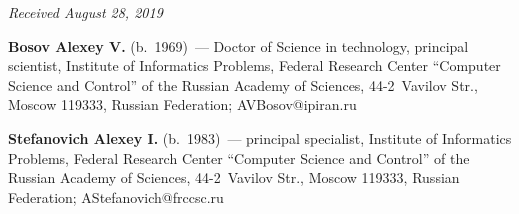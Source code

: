 \vspace*{-9pt}

\hfill{\small\textit{Received August 28, 2019}}


\vspace*{-24pt}

\Contr

\vspace*{-4pt}

\noindent
\textbf{Bosov Alexey V.} (b.\ 1969)~--- Doctor of Science in technology, 
principal scientist, Institute of Informatics Problems, Federal Research Center 
``Computer Science and Control'' of the Russian Academy of Sciences,  
44-2~Vavilov Str., Moscow 119333, Russian Federation; 
\mbox{AVBosov@ipiran.ru}


\noindent
\textbf{Stefanovich Alexey I.} (b.\ 1983)~--- principal specialist, Institute of 
Informatics Problems, Federal Research Center ``Computer Science and Control'' 
of the Russian Academy of Sciences, 44-2~Vavilov Str., Moscow 119333, Russian 
Federation; \mbox{AStefanovich@frccsc.ru}
\label{end\stat}

\renewcommand{\bibname}{\protect\rm Литература} 
      
